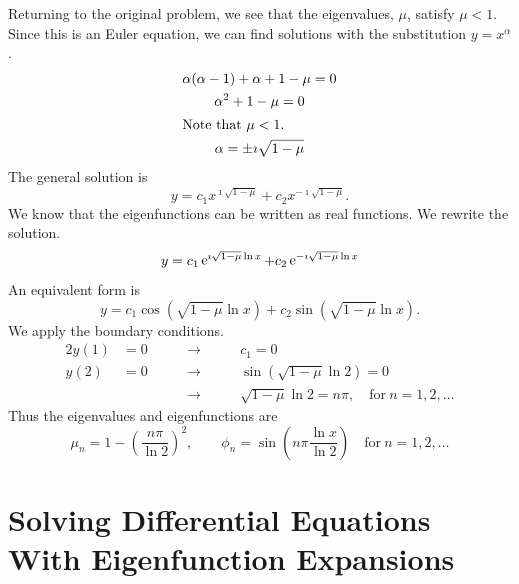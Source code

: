 \begin{Example}
  Returning to the original problem, we see that the eigenvalues, $\mu$, 
  satisfy $\mu < 1$.  Since this is an Euler equation, we can find solutions
  with the substitution $y = x^\alpha$.
  \begin{gather*}
    \alpha(\alpha-1) + \alpha + 1 - \mu = 0 
    \\
    \alpha^2 + 1 - \mu = 0 \\
    \intertext{Note that $\mu < 1$.}
    \alpha = \pm \imath \sqrt{1 - \mu}
  \end{gather*}
  The general solution is
  \[ 
  y = c_1 x^{\imath \sqrt{1-\mu}} + c_2 x^{-\imath \sqrt{1-\mu}}.
  \]
  We know that the eigenfunctions can be written as real functions.  We 
  rewrite the solution.
  \[ 
  y = c_1 \mathop{\mathrm{e}}\nolimits^{\imath \sqrt{1-\mu} \ln x} + c_2 \mathop{\mathrm{e}}\nolimits^{-\imath \sqrt{1-\mu} \ln x}
  \]
  An equivalent form is
  \[ 
  y = c_1 \cos(\sqrt{1-\mu} \ln x) + c_2 \sin(\sqrt{1-\mu} \ln x).
  \]
  We apply the boundary conditions.
  \begin{alignat*}{2}
    y(1) &= 0 \qquad &\to \qquad &c_1 = 0 
    \\
    y(2) &= 0 \qquad &\to \qquad &\sin(\sqrt{1-\mu} \ln 2) = 0 
    \\
    &\qquad &\to    \qquad  &\sqrt{1-\mu} \ln 2 = n \pi, \quad
    \mathrm{for}\ n = 1, 2, \ldots
  \end{alignat*}
  Thus the eigenvalues and eigenfunctions are
  \[ 
  \boxed{ 
    \mu_n = 1 - \left(\frac{n \pi}{\ln 2}\right)^2, \qquad
    \phi_n = \sin\left(n \pi \frac{\ln x}{\ln 2}\right)
    \quad \mathrm{for}\ n = 1, 2, \ldots 
    } 
  \]
\end{Example}





\section{Solving Differential Equations With Eigenfunction Expansions}



